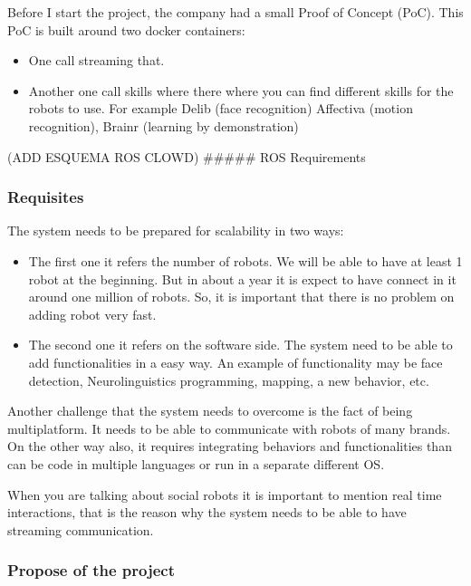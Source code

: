\documentclass[]{article}
\begin{document}
Before I start the project, the company had a small Proof of Concept
(PoC). This PoC is built around two docker containers:

\begin{itemize}
\item
  One call streaming that.
\item
  Another one call skills where there where you can find different
  skills for the robots to use. For example Delib (face recognition)
  Affectiva (motion recognition), Brainr (learning by demonstration)
\end{itemize}

(ADD ESQUEMA ROS CLOWD) \#\#\#\#\# ROS Requirements

\hypertarget{requisites}{%
\subsubsection{Requisites}\label{requisites}}

The system needs to be prepared for scalability in two ways:

\begin{itemize}
\item
  The first one it refers the number of robots. We will be able to have
  at least 1 robot at the beginning. But in about a year it is expect to
  have connect in it around one million of robots. So, it is important
  that there is no problem on adding robot very fast.
\item
  The second one it refers on the software side. The system need to be
  able to add functionalities in a easy way. An example of functionality
  may be face detection, Neurolinguistics programming, mapping, a new
  behavior, etc.
\end{itemize}

Another challenge that the system needs to overcome is the fact of being
multiplatform. It needs to be able to communicate with robots of many
brands. On the other way also, it requires integrating behaviors and
functionalities than can be code in multiple languages or run in a
separate different OS.

When you are talking about social robots it is important to mention real
time interactions, that is the reason why the system needs to be able to
have streaming communication.

\hypertarget{propose-of-the-project}{%
\subsubsection{Propose of the project}\label{propose-of-the-project}}
\end{document}
